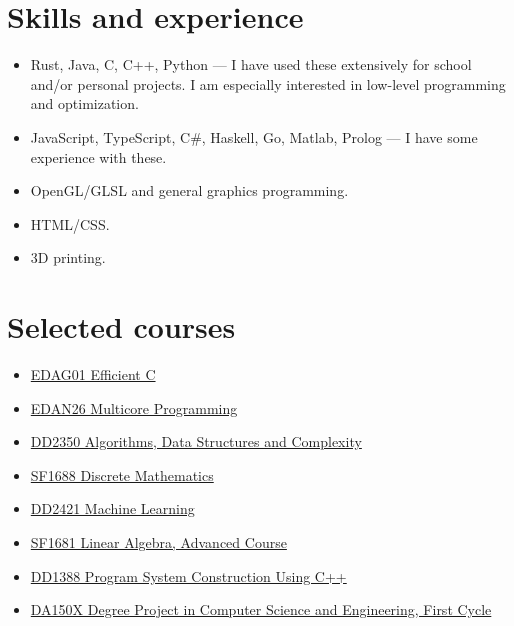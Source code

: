 \documentclass[11pt]{article}
\begin{document}
\section{Skills and experience}
\begin{itemize}
    \item Rust, Java, C, C++, Python --- I have used these extensively for school and/or personal projects. I am especially interested in low-level programming and optimization.
    \item JavaScript, TypeScript, C\#, Haskell, Go, Matlab, Prolog --- I have some experience with these.
    \item OpenGL/GLSL and general graphics programming.
    \item HTML/CSS.
    \item 3D printing.
\end{itemize}

\section{Selected courses}
\vspace*{-14pt}
\begin{multicols}{2}
\begin{itemize}
    \item \href{https://kurser.lth.se/lot/course-syllabus-en/23_24/EDAG01}{EDAG01 Efficient C}
    \item \href{https://kurser.lth.se/lot/course-syllabus-en/24_25/EDAN26}{EDAN26 Multicore Programming}
    \item \href{https://www.kth.se/student/kurser/kurs/DD2350?l=en}{DD2350 Algorithms, Data Structures and Complexity}
    \item \href{https://www.kth.se/student/kurser/kurs/SF1688?l=en}{SF1688 Discrete Mathematics}
    \item \href{https://www.kth.se/student/kurser/kurs/DD2421?l=en}{DD2421 Machine Learning}
    \item \href{https://www.kth.se/student/kurser/kurs/SF1681?l=en}{SF1681 Linear Algebra, Advanced Course}
    \item \href{https://www.kth.se/student/kurser/kurs/DD1388?l=en}{DD1388 Program System Construction Using C++}
    \item \href{https://www.kth.se/student/kurser/kurs/DA150X?l=en}{DA150X Degree Project in Computer Science and Engineering, First Cycle}
\end{itemize}
\end{multicols}
\end{document}
